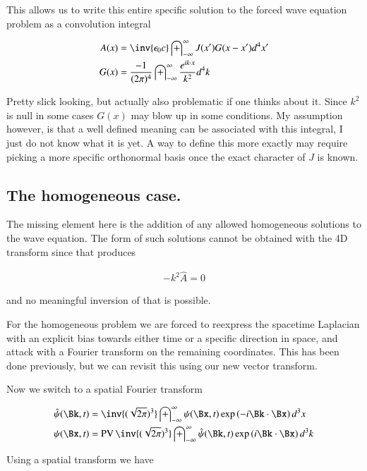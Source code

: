 \documentclass{article}
\DeclareMathOperator{\PV}{PV}
\newcommand{\IIinf}[0]{ \int_{-\infty}^\infty }
\begin{document}
This allows us to write this entire specific solution to the forced wave equation problem as a convolution integral

\begin{align}\label{eqn:potentialInHomogeneous}
A(x) &= \inv{\epsilon_0 c} \IIinf {J}(x') G(x-x') d^4 x' \\
G(x) &= \frac{-1}{ ({2\pi})^4} \IIinf \frac{e^{ i k \cdot x }}{ k^2 } d^4 k 
\end{align}

Pretty slick looking, but actually also problematic if one thinks about it.  Since $k^2$ is null in some cases
$G(x)$ may blow up in some conditions.  My assumption however, is that a well defined meaning can be associated
with this integral, I just do not know what it is yet.  A way to define this more exactly may require
picking a more specific orthonormal basis once the exact character of $J$ is known.

\subsection{ The homogeneous case. }

The missing element here is the addition of any allowed homogeneous solutions to the wave equation.
The form of such solutions cannot be obtained with the 4D transform since that produces

\begin{align*}
-k^2 \hat{A} = 0
\end{align*}

and no meaningful inversion of that is possible.

For the homogeneous problem we are forced to reexpress the spacetime Laplacian with an explicit bias towards either time or a specific direction in space, and attack with a Fourier transform on the remaining coordinates.  This has been done previously, but we can
revisit this using our new vector transform.

Now we switch to a spatial Fourier transform

\begin{align}\label{eqn:3DFourierTxDefinition}
\hat{\psi}(\Bk, t) &= \inv{(\sqrt{2\pi})^3} \IIinf \psi(\Bx, t) \exp\left( -i \Bk \cdot \Bx \right) d^3 x \\
{\psi}(\Bx, t) &= \PV \inv{(\sqrt{2\pi})^3} \IIinf \hat{\psi}(\Bk, t) \exp\left( i \Bk \cdot \Bx \right) d^3 k
\end{align}

Using a spatial transform we have
\end{document}
